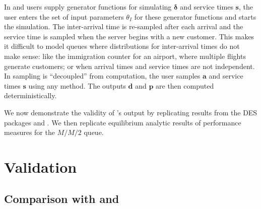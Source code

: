 \documentclass[article]{jss}
\begin{document}
In  and  users supply generator functions for
simulating $\mathbf{\delta}$ and service times $\mathbf{s}$, the user
enters the set of input parameters $\theta_I$ for these generator
functions and starts the simulation. The inter-arrival time is
re-sampled after each arrival and the service time is sampled when the
server begins with a new customer. This makes it difficult to model
queues where distributions for inter-arrival times do not make sense:
like the immigration counter for an airport, where multiple flights
generate customers; or when arrival times and service times are not
independent. In  sampling is ``decoupled'' from
computation, the user samples $\mathbf{a}$ and service times
$\mathbf{s}$ using any method. The outputs $\mathbf{d}$ and
$\mathbf{p}$ are then computed deterministically.

We now demonstrate the validity of 's output by replicating results from the DES packages  and . We then replicate equilibrium analytic results of performance measures for the $M/M/2$ queue. 

\section{Validation} \label{sec:Validation}

\subsection[Comparison with simmer and simpy]{Comparison with
   and }
\end{document}
